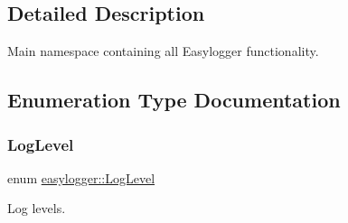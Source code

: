 \subsection{Detailed Description}
Main namespace containing all Easylogger functionality. 

\subsection{Enumeration Type Documentation}
\mbox{\label{namespaceeasylogger_a68cb882ead21af982c40e3621fcd50b0}} 
\subsubsection{\texorpdfstring{Log\+Level}{LogLevel}}
{\footnotesize\ttfamily enum \mbox{\hyperlink{namespaceeasylogger_a68cb882ead21af982c40e3621fcd50b0}{easylogger\+::\+Log\+Level}}}



Log levels. 

